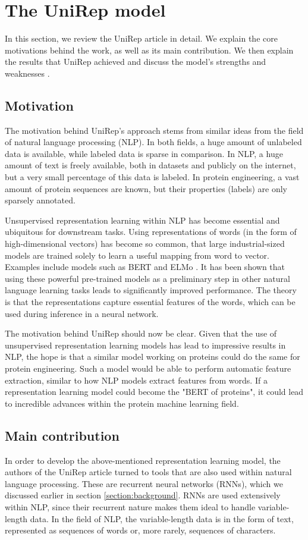 \documentclass[a4paper,12pt]{article}
\begin{document}
\clearpage
\section{The UniRep model}
In this section, we review the UniRep article in detail. We explain the core motivations behind the work, as well as its main contribution. We then explain the results that UniRep achieved and discuss the model's strengths and weaknesses .

\subsection{Motivation}
The motivation behind UniRep's approach stems from similar ideas from the field of natural language processing (NLP). In both fields, a huge amount of unlabeled data is available, while labeled data is sparse in comparison. In NLP, a huge amount of text is freely available, both in datasets and publicly on the internet, but a very small percentage of this data is labeled. In protein engineering, a vast amount of protein sequences are known, but their properties (labels) are only sparsely annotated.

Unsupervised representation learning within NLP has become essential and ubiquitous for downstream tasks. Using representations of words (in the form of high-dimensional vectors) has become so common, that large industrial-sized models are trained solely to learn a useful mapping from word to vector. Examples include models such as BERT and ELMo . It has been shown that using these powerful pre-trained models as a preliminary step in other natural language learning tasks leads to significantly improved performance. The theory is that the representations capture essential features of the words, which can be used during inference in a neural network.

The motivation behind UniRep should now be clear. Given that the use of unsupervised representation learning models has lead to impressive results in NLP, the hope is that a similar model working on proteins could do the same for protein engineering. Such a model would be able to perform automatic feature extraction, similar to how NLP models extract features from words. If a representation learning model could become the "BERT of proteins", it could lead to incredible advances within the protein machine learning field.

\subsection{Main contribution}
In order to develop the above-mentioned representation learning model, the authors of the UniRep article turned to tools that are also used within natural language processing. These are recurrent neural networks (RNNs), which we discussed earlier in section \ref{section:background}. RNNs are used extensively within NLP, since their recurrent nature makes them ideal to handle variable-length data. In the field of NLP, the variable-length data is in the form of text, represented as sequences of words or, more rarely, sequences of characters.
\end{document}
